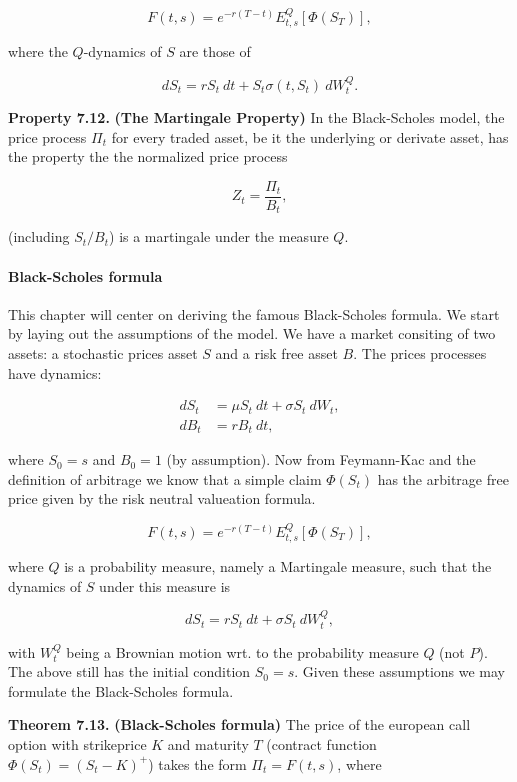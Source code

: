 \documentclass[
]{article}
\begin{document}
\[
F(t,s)=e^{-r(T-t)}E^Q_{t,s}[\Phi(S_T)],
\]

where the \(Q\)-dynamics of \(S\) are those of

\[
dS_t=rS_t\ dt+S_t\sigma(t,S_t)\ dW_t^Q.
\]

\textbf{Property 7.12.} \textbf{(The Martingale Property)} In the
Black-Scholes model, the price process \(\Pi_t\) for every traded asset,
be it the underlying or derivate asset, has the property the the
normalized price process

\[
Z_t=\frac{\Pi_t}{B_t},
\]

(including \(S_t/B_t\)) is a martingale under the measure \(Q\).

\hypertarget{black-scholes-formula}{%
\paragraph{Black-Scholes formula}\label{black-scholes-formula}}

This chapter will center on deriving the famous Black-Scholes formula.
We start by laying out the assumptions of the model. We have a market
consiting of two assets: a stochastic prices asset \(S\) and a risk free
asset \(B\). The prices processes have dynamics:

\begin{align*}
dS_t&=\mu S_t\ dt+\sigma S_t\ dW_t,\\
dB_t&=r B_t\ dt,
\end{align*}

where \(S_0=s\) and \(B_0=1\) (by assumption). Now from Feymann-Kac and
the definition of arbitrage we know that a simple claim \(\Phi(S_t)\)
has the arbitrage free price given by the risk neutral valueation
formula.

\[
F(t,s)=e^{-r(T-t)}E^Q_{t,s}[\Phi(S_T)],
\]

where \(Q\) is a probability measure, namely a Martingale measure, such
that the dynamics of \(S\) under this measure is

\[
dS_t=r S_t\ dt+\sigma S_t\ dW^Q_t,
\]

with \(W_t^Q\) being a Brownian motion wrt. to the probability measure
\(Q\) (not \(P\)). The above still has the initial condition \(S_0=s\).
Given these assumptions we may formulate the Black-Scholes formula.

\textbf{Theorem 7.13.} \textbf{(Black-Scholes formula)} The price of the
european call option with strikeprice \(K\) and maturity \(T\) (contract
function \(\Phi(S_t)=\left( S_t - K\right)^+\)) takes the form
\(\Pi_t=F(t,s)\), where
\end{document}

